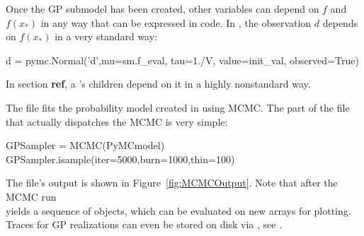 \documentclass[article]{jss}
\begin{document}
Once the GP submodel has been created, other variables can depend on $f$ and $f(x_*)$ in any way that can be expressed in  code. In , the observation $d$ depends on $f(x_*)$ in a very standard way: 
\begin{CodeChunk}
\begin{CodeInput}
d = pymc.Normal('d',mu=sm.f_eval, tau=1./V, value=init_val, observed=True)
\end{CodeInput}
\end{CodeChunk}
In section \textbf{ref}, a 's children depend on it in a highly nonstandard way. 


The file  fits the probability model created in  using MCMC. The part of the file that actually dispatches the MCMC is very simple:
\begin{CodeChunk}
\begin{CodeInput}
GPSampler = MCMC(PyMCmodel)
GPSampler.isample(iter=5000,burn=1000,thin=100)    
\end{CodeInput}
\end{CodeChunk}
The file's output is shown in Figure~\ref{fig:MCMCOutput}. Note that after the MCMC run \\ yields a sequence of  objects, which can be evaluated on new arrays for plotting. Traces for GP realizations can even be stored on disk via  \citep{tables}, see \cite{pymc}.

\end{document}

